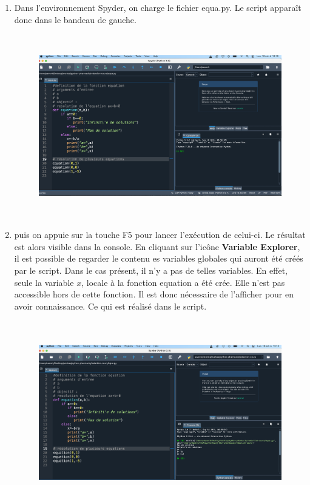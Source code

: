 \documentclass[a4paper,12pt]{article}
\begin{document}
\clearpage
\begin{enumerate}
\item Dans l'environnement Spyder, on charge le fichier equa.py. Le script appara\^it donc dans le bandeau de gauche.
\begin{figure}[h]
\begin{center}
\includegraphics[height=8cm]{./png/equation.png}
\end{center}
\end{figure}
\item puis on appuie sur la touche F5 pour lancer l'ex\'ecution de celui-ci. Le r\'esultat est alors visible dans la console. En cliquant sur l'ic\^one \textbf{Variable Explorer}, il est possible de regarder le contenu es variables globales qui auront \'et\'e cr\'e\'es par le script. Dans le cas pr\'esent, il n'y a pas de telles variables. En effet, seule la variable $x$, locale \`a la fonction equation a \'et\'e cr\'ee. Elle n'est pas accessible hors de cette fonction. Il est donc n\'ecessaire de l'afficher pour en avoir connaissance.  Ce qui est r\'ealis\'e dans le script.
\begin{figure}[h]
\begin{center}
\includegraphics[height=8cm]{./png/equation-resultat.png}
\end{center}
\end{figure}
\end{enumerate}
\end{document}
